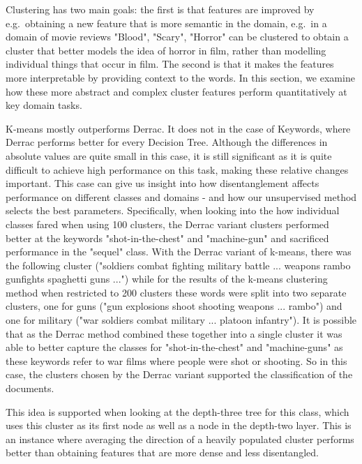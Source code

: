 Clustering has two main goals: the first is that features are improved  by e.g.\ obtaining a new feature that is more semantic in the domain, e.g.\ in a domain of movie reviews "Blood", "Scary",  "Horror" can be clustered to obtain a cluster that better models the idea of horror in film, rather than modelling individual things that occur in film. The second is that it makes the features more interpretable by providing context to the words. In this section, we examine how these more abstract and complex cluster features perform quantitatively at key domain tasks.

K-means mostly outperforms Derrac. It does not in the case of Keywords, where Derrac performs better for every Decision Tree. Although the differences in absolute values are quite small in this case, it is still significant as it is quite difficult to achieve high performance on this task, making these relative changes important. This case can give us insight into how disentanglement affects performance on different classes and domains - and how our unsupervised method selects the best parameters.  Specifically, when looking into the how individual classes fared when using 100 clusters, the Derrac variant clusters performed better at the keywords "shot-in-the-chest" and "machine-gun" and sacrificed performance in the "sequel" class. With the Derrac variant of k-means, there was the following cluster ("soldiers combat fighting military battle ... weapons rambo gunfights spaghetti guns ...") while for the results of the k-means clustering method when restricted to 200 clusters these words were split into two separate clusters, one for guns ("gun explosions shoot shooting weapons ... rambo") and one for military ("war soldiers combat military ... platoon infantry"). It is possible that as the Derrac method combined these together into a single cluster it was able to better capture the classes for "shot-in-the-chest" and "machine-guns" as these keywords refer to war films where people were shot or shooting. So in this case, the clusters chosen by the  Derrac variant supported the classification of the documents. 

This idea is supported when looking at the depth-three tree for this class, which uses this cluster as its first node as well as a node in the depth-two layer. This is an instance where averaging the direction of  a heavily populated cluster  performs better than obtaining features that are more dense and less disentangled. 



